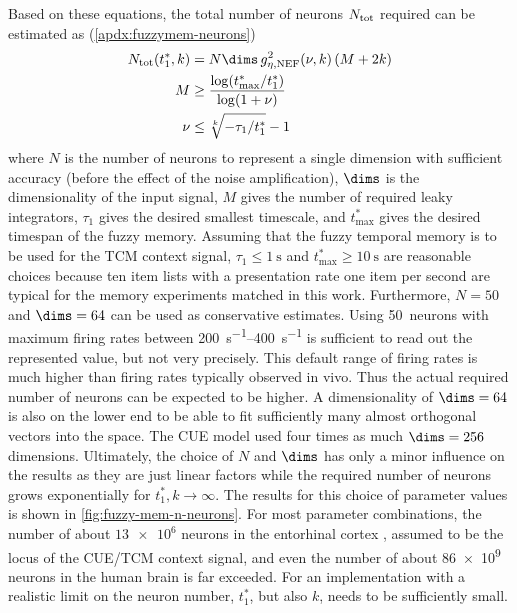 Based on these equations, the total number of neurons $N_{{\mathrm{tot}}}$ required can be estimated as (\cref{apdx:fuzzymem-neurons})
\begin{align}
    N_{\ped{tot}}(t^*_1, k) &= N \dims\, g_{\eta,\ped{NEF}}^2(\nu, k) \del{M + 2k} \label{eqn:fuzzy-n-neurons}\\
    M &\geq \frac{\log(t^*_{\max} / t^*_1)}{\log(1 + \nu)} \\
    \nu &\leq \sqrt[k]{-\tau_1 / t^*_1} - 1
\end{align}
where $N$ is the number of neurons to represent a single dimension with sufficient accuracy (before the effect of the noise amplification), $\dims$ is the dimensionality of the input signal, $M$ gives the number of required leaky integrators, $\tau_1$ gives the desired smallest timescale, and $t^*_{\max}$ gives the desired timespan of the fuzzy memory.
Assuming that the fuzzy temporal memory is to be used for the TCM context signal, $\tau_1 \leq \SI{1}{\second}$ and $t^*_{\max} \geq \SI{10}{\second}$ are reasonable choices because ten item lists with a presentation rate one item per second are typical for the memory experiments matched in this work.
Furthermore, $N = 50$ and $\dims = 64$ can be used as conservative estimates.
Using \num{50}~neurons with maximum firing rates between \SIrange{200}{400}{\second^{-1}} is sufficient to read out the represented value, but not very precisely.
This default range of firing rates is much higher than firing rates typically observed in vivo.
Thus the actual required number of neurons can be expected to be higher.
A dimensionality of $\dims = 64$ is also on the lower end to be able to fit sufficiently many almost orthogonal vectors into the space.
The CUE model used four times as much $\dims = 256$ dimensions.
Ultimately, the choice of $N$ and $\dims$ has only a minor influence on the results as they are just linear factors while the required number of neurons grows exponentially for $t^*_1, k \rightarrow \infty$.
The results for this choice of parameter values is shown in \cref{fig:fuzzy-mem-n-neurons}.
For most parameter combinations, the number of about $\num{13e6}$ neurons in the entorhinal cortex \parencite{west1998}, assumed to be the locus of the CUE/TCM context signal, and even the number of about \num{86e9} neurons in the human brain \parencite{azevedo2009} is far exceeded.
For an implementation with a realistic limit on the neuron number, $t^*_1$, but also $k$, needs to be sufficiently small.
